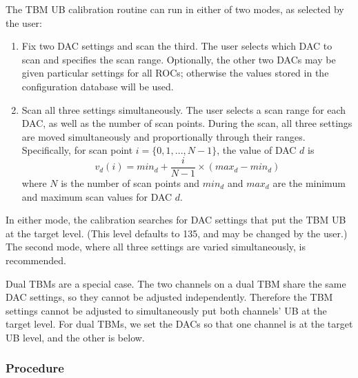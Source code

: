 The TBM UB calibration routine can run in either of two modes, as selected by the user:
\begin{enumerate}
\item Fix two DAC settings and scan the third.  The user selects which DAC to scan and specifies the scan range.  Optionally, the other two DACs may be given particular settings for all ROCs; otherwise the values stored in the configuration database will be used.
\item Scan all three settings simultaneously.  The user selects a scan range for each DAC, as well as the number of scan points.  During the scan, all three settings are moved simultaneously and proportionally through their ranges.  Specifically, for scan point $i = \{0, 1,..., N-1\}$, the value of DAC $d$ is
\begin{equation}
v_{d}(i) = min_{d} + \frac{i}{N-1} \times (max_{d}-min_{d})
\end{equation}
where $N$ is the number of scan points and $min_{d}$ and $max_{d}$ are the minimum and maximum scan values for DAC $d$.
\end{enumerate}
In either mode, the calibration searches for DAC settings that put the TBM UB at the target level. (This level defaults to 135, and may be changed by the user.)  The second mode, where all three settings are varied simultaneously, is recommended.

Dual TBMs are a special case.  The two channels on a dual TBM share the same DAC settings, so they cannot be adjusted independently.  Therefore the TBM settings cannot be adjusted to simultaneously put both channels' UB at the target level.  For dual TBMs, we set the DACs so that one channel is at the target UB level, and the other is below.

\subsubsection{Procedure}

